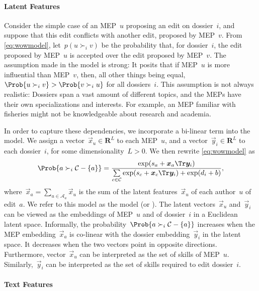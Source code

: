 \paragraph{Latent Features}

Consider the simple case of an MEP~$u$ proposing an edit on dossier~$i$, and suppose that this edit conflicts with another edit, proposed by MEP~$v$.
From \eqref{eq:wowmodel}, let~$p( u \succ_i v)$ be the probability that, for dossier~$i$, the edit proposed by MEP~$u$ is accepted over the edit proposed by MEP~$v$.
The assumption made in the \wow{} model is strong:
It posits that if MEP~$u$ is more influential than MEP~$v$, then, all other things being equal,~$\Prob{u \succ_i v} > \Prob{v \succ_i u}$ for all dossiers~$i$.
This assumption is not always realistic:
Dossiers span a vast amount of different topics, and the MEPs have their own specializations and interests.
For example, an MEP familiar with fisheries might not be knowledgeable about research and academia.

In order to capture these dependencies, we incorporate a bi-linear term into the \wow{} model.
We assign a vector~$\vec{x}_u \in \mathbf{R}^L$ to each MEP~$u$, and a vector~$\vec{y}_i \in \mathbf{R}^L$ to each dossier~$i$, for some dimensionality~$L > 0$.
We then rewrite \eqref{eq:wowmodel} as
\begin{equation}
	\label{eq:wowlatent}
	\Prob{ a \succ_i \mathcal{C} - \{ a\} } =
	\frac{\exp( s_a + \vec{x}_a\Tr \vec{y}_i) }{ \sum\limits_{c \in \mathcal{C} } \exp(s_c + \vec{x}_c\Tr \vec{y}_i) + \exp(d_i + b) },
\end{equation}
where~$\vec{x}_a = \sum_{u \in \mathcal{A}_a} \vec{x}_u$ is the sum of the latent features~$\vec{x}_u$ of each author~$u$ of edit~$a$.
We refer to this model as the  model (or ).
The latent vectors~$\vec{x}_u$ and~$\vec{y}_i$ can be viewed as the embeddings of MEP~$u$ and of dossier~$i$ in a Euclidean latent space.
Informally, the probability~$\Prob{ a \succ_i \mathcal{C} - \{ a\} }$ increases when the MEP embedding~$ \vec{x}_a$ is co-linear with the dossier embedding~$ \vec{y}_i$ in the latent space.
It decreases when the two vectors point in opposite directions.
Furthermore, vector~$ \vec{x}_u$ can be interpreted as the set of skills of MEP~$u$.
Similarly,~$ \vec{y}_i$ can be interpreted as the set of skills required to edit dossier~$i$.

\paragraph{Text Features}

